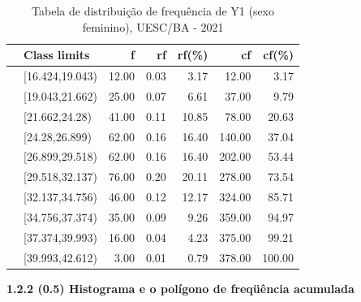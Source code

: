 \documentclass[12pt]{article}\usepackage[]{graphicx}\usepackage[]{color}
\begin{document}
\begin{table}[!ht]
\centering
\caption{Tabela de distribuição de frequência de Y1 (sexo feminino), UESC/BA - 2021}
  \begin{tabular}{rlrrrrr}
    \toprule
   & Class limits & f & rf & rf(\%) & cf & cf(\%) \\ 
    \midrule
& [16.424,19.043) & 12.00 & 0.03 & 3.17 & 12.00 & 3.17 \\ 
  & [19.043,21.662) & 25.00 & 0.07 & 6.61 & 37.00 & 9.79 \\ 
  & [21.662,24.28) & 41.00 & 0.11 & 10.85 & 78.00 & 20.63 \\ 
  & [24.28,26.899) & 62.00 & 0.16 & 16.40 & 140.00 & 37.04 \\ 
  & [26.899,29.518) & 62.00 & 0.16 & 16.40 & 202.00 & 53.44 \\ 
  & [29.518,32.137) & 76.00 & 0.20 & 20.11 & 278.00 & 73.54 \\ 
  & [32.137,34.756) & 46.00 & 0.12 & 12.17 & 324.00 & 85.71 \\ 
  & [34.756,37.374) & 35.00 & 0.09 & 9.26 & 359.00 & 94.97 \\ 
  & [37.374,39.993) & 16.00 & 0.04 & 4.23 & 375.00 & 99.21 \\ 
    & [39.993,42.612) & 3.00 & 0.01 & 0.79 & 378.00 & 100.00 \\ 
     \bottomrule
  \end{tabular}
\end{table}
 \pagebreak
      \textbf{1.2.2 (0.5) Histograma e o polígono de freqüência acumulada}
\end{document}

